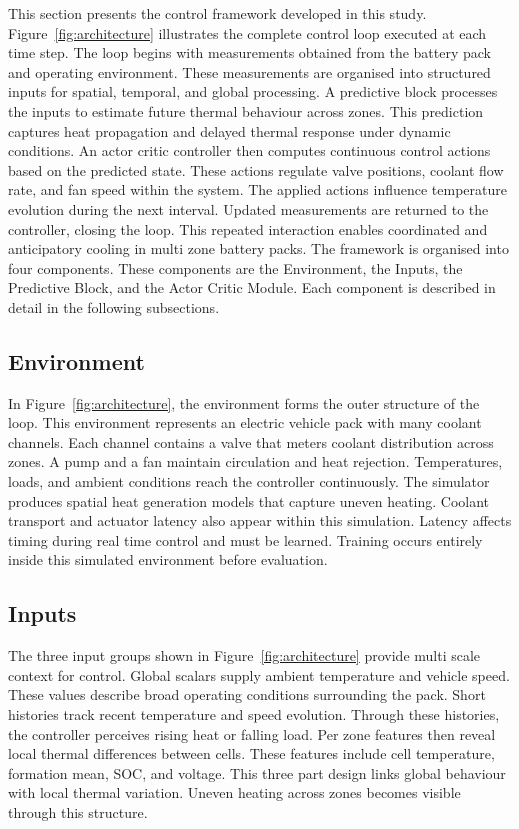 \documentclass{article}
\begin{document}
This section presents the control framework developed in this study.
Figure~\ref{fig:architecture} illustrates the complete control loop executed at each time step.
The loop begins with measurements obtained from the battery pack and operating environment.
These measurements are organised into structured inputs for spatial, temporal, and global processing.
A predictive block processes the inputs to estimate future thermal behaviour across zones.
This prediction captures heat propagation and delayed thermal response under dynamic conditions.
An actor critic controller then computes continuous control actions based on the predicted state.
These actions regulate valve positions, coolant flow rate, and fan speed within the system.
The applied actions influence temperature evolution during the next interval.
Updated measurements are returned to the controller, closing the loop.
This repeated interaction enables coordinated and anticipatory cooling in multi zone battery packs.
The framework is organised into four components.
These components are the Environment, the Inputs, the Predictive Block, and the Actor Critic Module.
Each component is described in detail in the following subsections.

\subsection{Environment}

In Figure~\ref{fig:architecture}, the environment forms the outer structure of the loop.
This environment represents an electric vehicle pack with many coolant channels.
Each channel contains a valve that meters coolant distribution across zones.
A pump and a fan maintain circulation and heat rejection.
Temperatures, loads, and ambient conditions reach the controller continuously.
The simulator produces spatial heat generation models that capture uneven heating.
Coolant transport and actuator latency also appear within this simulation.
Latency affects timing during real time control and must be learned.
Training occurs entirely inside this simulated environment before evaluation.

\subsection{Inputs}

The three input groups shown in Figure~\ref{fig:architecture} provide multi scale context for control.
Global scalars supply ambient temperature and vehicle speed.
These values describe broad operating conditions surrounding the pack.
Short histories track recent temperature and speed evolution.
Through these histories, the controller perceives rising heat or falling load.
Per zone features then reveal local thermal differences between cells.
These features include cell temperature, formation mean, SOC, and voltage.
This three part design links global behaviour with local thermal variation.
Uneven heating across zones becomes visible through this structure.
\end{document}
